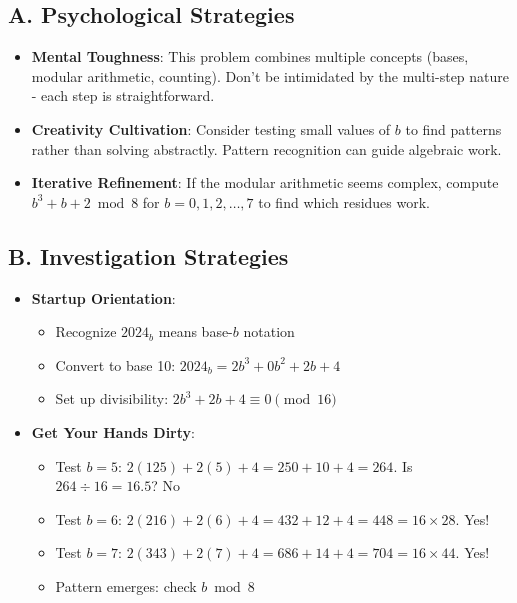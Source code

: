 \documentclass[11pt]{article}
\begin{document}
\begin{strategicbox}
\subsection*{A. Psychological Strategies}
\begin{itemize}[leftmargin=*]
    \item \textbf{Mental Toughness}: This problem combines multiple concepts (bases, modular arithmetic, counting). Don't be intimidated by the multi-step nature - each step is straightforward.
    
    \item \textbf{Creativity Cultivation}: Consider testing small values of $b$ to find patterns rather than solving abstractly. Pattern recognition can guide algebraic work.
    
    \item \textbf{Iterative Refinement}: If the modular arithmetic seems complex, compute $b^3 + b + 2 \bmod 8$ for $b = 0, 1, 2, \ldots, 7$ to find which residues work.
\end{itemize}

\subsection*{B. Investigation Strategies}
\begin{itemize}[leftmargin=*]
    \item \textbf{Startup Orientation}: 
    \begin{itemize}
        \item Recognize $2024_b$ means base-$b$ notation
        \item Convert to base 10: $2024_b = 2b^3 + 0b^2 + 2b + 4$
        \item Set up divisibility: $2b^3 + 2b + 4 \equiv 0 \pmod{16}$
    \end{itemize}
    
    \item \textbf{Get Your Hands Dirty}: 
    \begin{itemize}
        \item Test $b = 5$: $2(125) + 2(5) + 4 = 250 + 10 + 4 = 264$. Is $264 \div 16 = 16.5$? No \texttimes
        \item Test $b = 6$: $2(216) + 2(6) + 4 = 432 + 12 + 4 = 448 = 16 \times 28$. Yes! \checkmark
        \item Test $b = 7$: $2(343) + 2(7) + 4 = 686 + 14 + 4 = 704 = 16 \times 44$. Yes! \checkmark
        \item Pattern emerges: check $b \bmod 8$
    \end{itemize}
    

\end{itemize}
\end{strategicbox}
\end{document}
